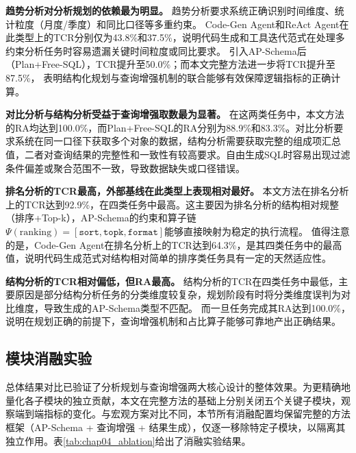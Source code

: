 
\textbf{趋势分析对分析规划的依赖最为明显。} 趋势分析要求系统正确识别时间维度、统计粒度（月度/季度）和同比口径等多重约束。
Code-Gen Agent和ReAct Agent在此类型上的TCR分别仅为43.8\%和37.5\%，说明代码生成和工具迭代范式在处理多约束分析任务时容易遗漏关键时间粒度或同比要求。
引入AP-Schema后（Plan+Free-SQL），TCR提升至50.0\%；而本文完整方法进一步将TCR提升至87.5\%，
表明结构化规划与查询增强机制的联合能够有效保障逻辑指标的正确计算。

\textbf{对比分析与结构分析受益于查询增强取数最为显著。} 在这两类任务中，本文方法的RA均达到100.0\%，而Plan+Free-SQL的RA分别为88.9\%和83.3\%。对比分析要求系统在同一口径下获取多个对象的数据，结构分析需要获取完整的组成项汇总值，二者对查询结果的完整性和一致性有较高要求。自由生成SQL时容易出现过滤条件偏差或聚合范围不一致，导致数据缺失或口径错误。

\textbf{排名分析的TCR最高，外部基线在此类型上表现相对最好。} 本文方法在排名分析上的TCR达到92.9\%，在四类任务中最高。这主要因为排名分析的结构相对规整（排序+Top-k），AP-Schema的约束和算子链$\Psi(\text{ranking})=[\texttt{sort}, \texttt{topk}, \texttt{format}]$能够直接映射为稳定的执行流程。
值得注意的是，Code-Gen Agent在排名分析上的TCR达到64.3\%，是其四类任务中的最高值，说明代码生成范式对结构相对简单的排序类任务具有一定的天然适应性。

\textbf{结构分析的TCR相对偏低，但RA最高。} 结构分析的TCR在四类任务中最低，主要原因是部分结构分析任务的分类维度较复杂，规划阶段有时将分类维度误判为对比维度，导致生成的AP-Schema类型不匹配。
而一旦任务完成其RA达到100.0\%，说明在规划正确的前提下，查询增强机制和占比算子能够可靠地产出正确结果。

\subsection{模块消融实验}

总体结果对比已验证了分析规划与查询增强两大核心设计的整体效果。为更精确地量化各子模块的独立贡献，本文在完整方法的基础上分别关闭五个关键子模块，观察端到端指标的变化。与宏观方案对比不同，本节所有消融配置均保留完整的方法框架（AP-Schema + 查询增强 + 结果生成），仅逐一移除特定子模块，以隔离其独立作用。表\ref{tab:chap04_ablation}给出了消融实验结果。

